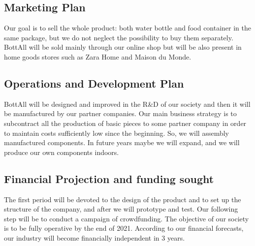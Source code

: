 \subsection{Marketing Plan}
Our goal is to sell the whole product: both water bottle and food container in the same package, but we do not neglect the possibility to buy them separately. BottAll will be sold mainly through our online shop but will be also present in home goods stores such as Zara Home and Maison du Monde.

\subsection{Operations and Development Plan}
BottAll will be designed and improved in the R\&D of our society and then it will be manufactured by our partner companies. Our main business strategy is to subcontract all the production of basic pieces to some partner company in order to maintain costs sufficiently low since the beginning. So, we will assembly manufactured components. In future years maybe we will expand, and we will produce our own components indoors.

\subsection{Financial Projection and funding sought}
The first period will be devoted to the design of the product and to set up the structure of the company, and after we will prototype and test. Our following step will be to conduct a campaign of crowdfunding. The objective of our society is to be fully operative by the end of 2021. According to our financial forecasts, our industry will become financially independent in 3 years.

 
